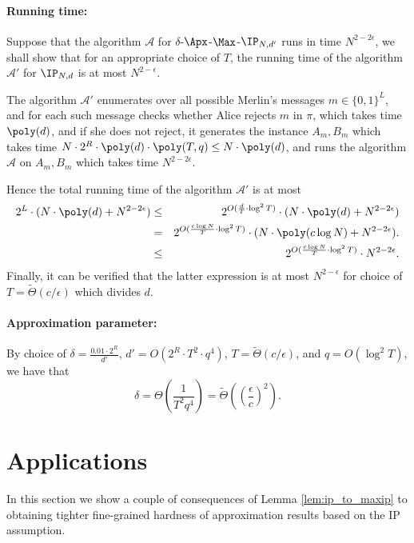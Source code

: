 \documentclass[11pt]{article}
\begin{document}
\paragraph{Running time:} 
Suppose that the algorithm $\mathcal{A}$ for $\delta$-$\Apx$-$\Max$-$\IP_{N,d'}$  runs in time $N^{2-2\epsilon}$, we shall show that for an appropriate choice of $T$, the running time of the algorithm $\mathcal{A'}$ for 
$\IP_{N,d}$ is at most $N^{2-\epsilon}$. 

The algorithm $\mathcal{A'}$ enumerates over all possible Merlin's messages  $m \in \{0,1\}^L$, and for each such message checks whether Alice rejects $m$ in $\pi$, which takes time $\poly(d)$, and if she does not reject, it generates the instance $A_m, B_m$ which takes time $N \cdot 2^R \cdot \poly(d) \cdot \poly(T,q) \leq N \cdot \poly(d)$, and runs the algorithm $\mathcal A$ on $A_m, B_m$ which takes time $N^{2-2\epsilon}$. 

Hence the total running time of the algorithm $\mathcal{A}'$ is at most
\begin{eqnarray*}
 2^L \cdot (N \cdot \poly(d) + N^{2-2\epsilon}) &  \leq & 2^{O  ( \frac d T \cdot \log^2 T)} \cdot (N \cdot \poly(d) + N^{2-2\epsilon}) \\
  &  = & 2^{O (  \frac{c\log N} {T}\cdot \log^2 T)} \cdot (N \cdot \poly(c \log N) + N^{2-2\epsilon}). \\
    &  \leq & 2^{O (  \frac{c\log N} {T}\cdot \log^2 T)} \cdot N^{2-2\epsilon}. 
 \end{eqnarray*}
Finally, it can be verified that the latter expression is at most $N^{2 - \epsilon}$ for  choice of $T = \tilde \Theta( c/\epsilon) $ which divides $d$.


\paragraph{Approximation parameter:}

By choice of 
$\delta = \frac {0.01 \cdot 2^R } {d'}$, $d' = O(2^R \cdot T^2 \cdot q^4)$,  $T = \tilde \Theta( c/\epsilon) $,
and $q = O(\log^2T)$, we have that
$$\delta = \Theta \left( \frac{1} {T^2 q^4} \right) = \tilde \Theta \left(\left(\frac \epsilon c\right)^2\right).$$


\section{Applications}\label{sec:apps}



In this section we show a couple of consequences of Lemma \ref{lem:ip_to_maxip} to obtaining tighter fine-grained hardness of approximation results based on the IP assumption.
\end{document}
